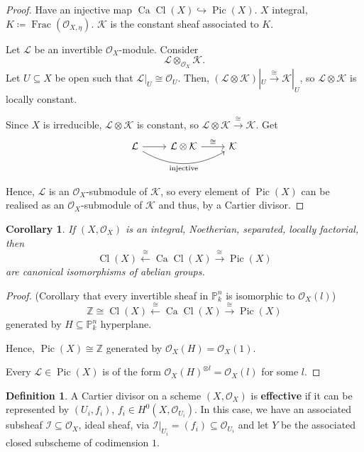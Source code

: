 \documentclass[12pt]{article}
\DeclareMathOperator{\Frac}{Frac}
\DeclareMathOperator{\Pic}{Pic}
\DeclareMathOperator{\Cl}{Cl}
\DeclareMathOperator{\Ca}{Ca}
\newtheorem*{corollary}{Corollary}
\theoremstyle{definition}
\newtheorem*{definition}{Definition}
\theoremstyle{remark}
\begin{document}
\begin{proof}
Have an injective map $\Ca\Cl(X)\hookrightarrow\Pic(X)$. $X$ integral, $K\coloneqq\Frac(\mathcal{O}_{X,\eta})$. $\mathcal{K}$ is the constant sheaf associated to $K$.

Let $\mathcal{L}$ be an invertible $\mathcal{O}_X$-module. Consider
\[\mathcal{L}\otimes_{\mathcal{O}_X}\mathcal{K}.\]
Let $U\subseteq X$ be open such that $\mathcal{L}|_U\cong\mathcal{O}_U$. Then, $(\mathcal{L}\otimes\mathcal{K})|_U\overset{\cong}{\longrightarrow}\mathcal{K}|_U$, so $\mathcal{L}\otimes\mathcal{K}$ is locally constant.

Since $X$ is irreducible, $\mathcal{L}\otimes\mathcal{K}$ is constant, so $\mathcal{L}\otimes\mathcal{K}\xrightarrow{\cong}\mathcal{K}$. Get
\[
\begin{tikzcd}
\mathcal{L}\arrow[r]\arrow[rr,bend right,"\text{injective}",swap]&\mathcal{L}\otimes\mathcal{K}\arrow[r,"\cong"]&\mathcal{K}
\end{tikzcd}
\]

Hence, $\mathcal{L}$ is an $\mathcal{O}_X$-submodule of $\mathcal{K}$, so every element of $\Pic(X)$ can be realised as an $\mathcal{O}_X$-submodule of $\mathcal{K}$ and thus, by a Cartier divisor.
\end{proof}

\begin{corollary}
If $(X,\mathcal{O}_X)$ is an integral, Noetherian, separated, locally factorial, then
\[\Cl(X)\overset{\cong}{\longleftarrow}\Ca\Cl(X)\overset{\cong}{\longrightarrow}\Pic(X)\]
are canonical isomorphisms of abelian groups.
\end{corollary}

\begin{proof}
(Corollary that every invertible sheaf in $\mathbb{P}_k^n$ is isomorphic to $\mathcal{O}_X(l)$)
\[\mathbb{Z}\cong\Cl(X)\overset{\cong}{\longleftarrow}\Ca\Cl(X)\overset{\cong}{\longrightarrow}\Pic(X)\]
generated by $H\subseteq\mathbb{P}_k^n$ hyperplane.

Hence, $\Pic(X)\cong\mathbb{Z}$ generated by $\mathcal{O}_X(H)=\mathcal{O}_X(1)$.

Every $\mathcal{L}\in\Pic(X)$ is of the form $\mathcal{O}_X(H)^{\otimes l}=\mathcal{O}_X(l)$ for some $l$.
\end{proof}

\begin{definition}
A Cartier divisor on a scheme $(X,\mathcal{O}_X)$ is \textbf{effective} if it can be represented by $(U_i,f_i)$, $f_i\in H^0(X,\mathcal{O}_{U_i})$. In this case, we have an associated subsheaf $\mathcal{I}\subseteq\mathcal{O}_X$, ideal sheaf, via $\mathcal{I}|_{U_i}=(f_i)\subseteq\mathcal{O}_{U_i}$ and let $Y$ be the associated closed subscheme of codimension $1$.
\end{definition}
\end{document}
